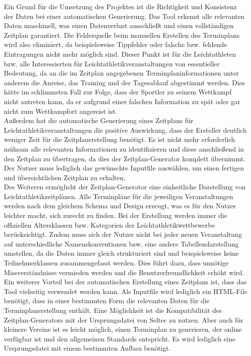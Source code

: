 Ein Grund für die Umsetzung des Projektes ist die Richtigkeit und Konsistenz der Daten bei einer automatischen Generierung. Das Tool erkennt alle relevanten Daten maschinell, was einen Datenverlust ausschließt und einen vollständigen Zeitplan garantiert. Die Fehlerquelle beim manuellen Erstellen des Terminplans wird also eliminiert, da beispielsweise Tippfehler oder falsche bzw. fehlende Eintragungen nicht mehr möglich sind. Dieser Punkt ist für die Leichtathleten bzw. alle Interessierten für Leichtathletikveranstaltungen von essentieller Bedeutung, da an die im Zeitplan angegebenen Terminplaninformationen unter anderem die Anreise, das Training und der Tagesablauf abgestimmt werden. Dies hätte im schlimmsten Fall zur Folge, dass der Sportler zu seinem Wettkampf nicht antreten kann, da er aufgrund einer falschen Information zu spät oder gar nicht zum Wettkampfort angereist ist.\\
Außerdem hat die automatische Generierung eines Zeitplans für Leichtathletikveranstaltungen die positive Auswirkung, dass der Ersteller deutlich weniger Zeit für die Zeitplanerstellung benötigt. Es ist nicht mehr erforderlich mühsam alle relevanten Informationen zu identifizieren und diese anschließend in den Zeitplan zu übertragen, da dies der Zeitplan-Generator komplett übernimmt. Der Nutzer muss lediglich das gewünschte Inputfile auswählen, um einen fertigen und übersichtlichen Zeitplan zu erhalten. \\
Des Weiteren ermöglicht der Zeitplan-Generator eine einheitliche Darstellung von Leichtathletikzeitplänen. Alle Terminpläne für die jeweiligen Veranstaltungen werden nach dem gleichem Schema und Design erzeugt, was es für den Nutzer leichter macht, sich zurecht zu finden. Bei der Erstellung werden immer die offiziellen Altersklassen bzw. Kategorien der Leichtathletikwettbewerbe berücksichtigt. Zudem muss sich der Nutzer nicht bei jeder neuen Veranstaltung auf unterschiedliche Namenskonventionen bzw. eine andere Tabellendarstellung umstellen, da die Daten immer gleich strukturiert sind und beispielsweise keine Teilnehmerklassen zusammengefasst werden. Dies führt dazu, dass unnötige Missverständnisse vermieden werden und die Benutzerfreundlichkeit erhöht wird.\\
Ein weiterer Vorteil bei der automatischen Erstellung eines Zeitplans ist, dass das Tool vielseitig verwendet werden kann. Als Inputfile wird lediglich ein HTML-File benötigt, dass in einer bestimmten Form die relevanten Daten für die Terminplanerstellung enthält. Eine Möglichkeit ist die Kompatibilität des Zeitplan-Generators mit der Ursprungsdatei von Seltec zu nutzen. Aber auch für kleinere Vereine ist es leicht möglich, einen Terminplan zu generieren, der online verfügbar ist und den allgemeinen Standards entspricht. Es wird lediglich eine Ursprungsdatei mit einem bestimmten Aufbau benötigt.\\

